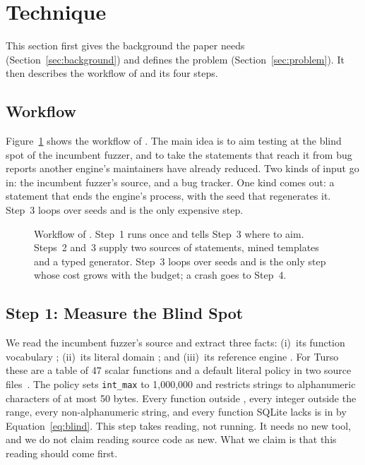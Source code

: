 \section{Technique}
\label{sec:technique}

This section first gives the background the paper needs
(Section~\ref{sec:background}) and defines the problem
(Section~\ref{sec:problem}). It then describes the workflow of \tool and its
four steps.




\subsection{Workflow}
\label{sec:workflow}

Figure~\ref{fig:overview} shows the workflow of \tool. The main idea is to aim
testing at the blind spot of the incumbent fuzzer, and to take the statements
that reach it from bug reports another engine's maintainers have already
reduced. Two kinds of input go in: the incumbent fuzzer's source, and a bug
tracker. One kind comes out: a statement that ends the engine's process, with the
seed that regenerates it. Step~3 loops over seeds and is the only expensive step.

\begin{figure}[t]
  \centering
  
  \caption{Workflow of \tool. Step~1 runs once and tells Step~3 where to aim.
  Steps~2 and~3 supply two sources of statements, mined templates and a typed
  generator. Step~3 loops over seeds and is the only step whose cost grows with
  the budget; a crash goes to Step~4.}
  \label{fig:overview}
\end{figure}

\subsection{Step 1: Measure the Blind Spot}
\label{sec:step-blind}
We read the incumbent fuzzer's source and extract three facts: (i)~its function
vocabulary \Voc; (ii)~its literal domain \Lit; and (iii)~its reference engine
\Rengine. For Turso these are a table of 47 scalar functions and a default literal
policy in two source files~\cite{tursofuzzer}. The policy sets
\texttt{int\_max} to 1{,}000{,}000 and restricts strings to alphanumeric
characters of at most 50 bytes. Every function outside \Voc, every integer outside
the range, every non-alphanumeric string, and every function SQLite lacks is in
\Blind by Equation~\eqref{eq:blind}. This step takes reading, not running. It
needs no new tool, and we do not claim reading source code as new. What we
claim is that this reading should come first.

